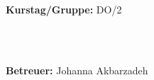 \documentclass[12pt,a4paper]{article}
\begin{document}
\begin{verbatim}


\end{verbatim}
			\begin{flushleft}
			\textbf{\Large{Kurstag/Gruppe:}} \Large{DO/2}
			\end{flushleft}

\begin{verbatim}



\end{verbatim}
			\begin{flushleft}
			\LARGE{\textbf{Betreuer:}}	\Large{Johanna Akbarzadeh}	
			\end{flushleft}
\end{document}
